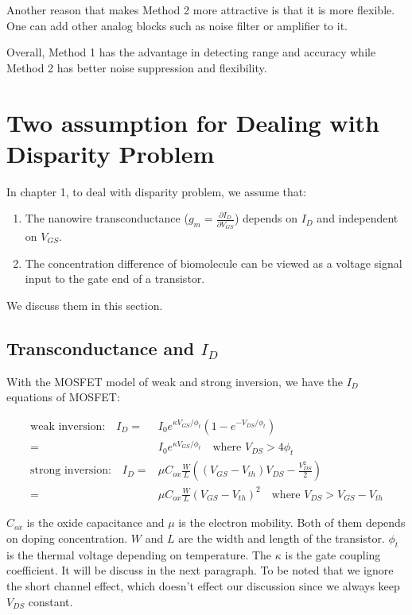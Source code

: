 Another reason that makes Method 2 more attractive is that it is more flexible.
One can add other analog blocks such as noise filter or amplifier to it.

Overall, Method 1 has the advantage in detecting range and accuracy while Method 2 has better noise suppression and flexibility.



\section{Two assumption for Dealing with Disparity Problem} \label{sec:assumpDiscuss}
In chapter 1, to deal with disparity problem, we assume that:
\begin{enumerate}
    \item The nanowire transconductance ($g_m = \frac{\partial I_D}{\partial V_{GS}}$) depends on $I_D$ and independent on $V_{GS}$.
    \item The concentration difference of biomolecule can be viewed as a voltage signal input to the gate end of a transistor.
\end{enumerate}
We discuss them in this section.

\subsection{Transconductance and $I_D$} \label{section:IdGm}
With the MOSFET model of weak and strong inversion, we have the $I_D$ equations of MOSFET:
\setlength{\mathindent}{1.5cm}

\begin{align}
    \text{weak inversion:} \quad I_D   = & I_0e^{\kappa V_{GS}/\phi_t}(1 - e^{-V_{DS}/\phi_t})\\  \label{eq:Ikappa}
                                       = & I_0e^{\kappa V_{GS}/\phi_t} \quad \text{where $V_{DS} > 4 \phi_t$ } \\
    \text{strong inversion:} \quad I_D = & \mu C_{ox} \frac{W}{L}((V_{GS} - V_{th})V_{DS} - \frac{V_{DS}^2}{2}) \\
                                       = & \mu C_{ox} \frac{W}{L}(V_{GS} - V_{th})^2 \quad \text{where $V_{DS} > V_{GS} - V_{th}$} \label{eq:ID_Strong}
\end{align}

$C_{ox}$ is the oxide capacitance and $\mu$ is the electron mobility.
Both of them depends on doping concentration.
$W$ and $L$ are the width and length of the transistor.
$\phi_t$ is the thermal voltage depending on temperature.
The $\kappa$ is the gate coupling coefficient.
It will be discuss in the next paragraph.
To be noted that we ignore the short channel effect, which doesn't effect our discussion since we always keep $V_{DS}$ constant.

